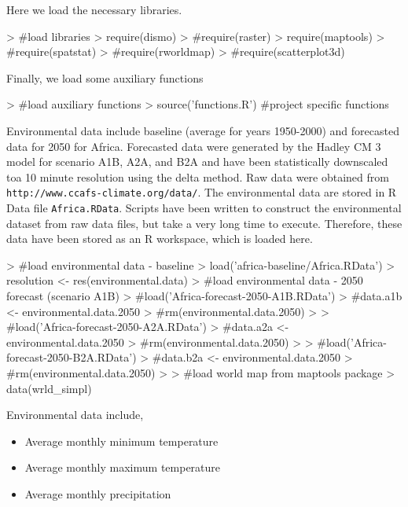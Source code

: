 \documentclass[10pt]{article}
\renewenvironment{Schunk}{\vspace{\topsep}}{\vspace{\topsep}}
\newcommand{\code}[1]{\texttt{#1}}
\begin{document}
Here we load the necessary libraries.
  
\begin{Schunk}
\begin{Sinput}
> #load libraries
> require(dismo)
> #require(raster)
> require(maptools)
> #require(spatstat)
> #require(rworldmap)
> #require(scatterplot3d)
\end{Sinput}
\end{Schunk}
  
Finally, we load some auxiliary functions
  
\begin{Schunk}
\begin{Sinput}
> #load auxiliary functions
> source('functions.R')   #project specific functions
\end{Sinput}
\end{Schunk}

Environmental data include baseline (average for years 1950-2000) and forecasted data for 2050 for Africa. Forecasted data were generated by the Hadley CM 3 model for scenario A1B, A2A, and B2A and have been statistically downscaled toa 10 minute resolution using the delta method. Raw data were obtained from \code{http://www.ccafs-climate.org/data/}. The environmental data are stored in R Data file \code{Africa.RData}. Scripts have been written to construct the environmental dataset from raw data files, but take a very long time to execute. Therefore, these data have been stored as an R workspace, which is loaded here.

\begin{Schunk}
\begin{Sinput}
> #load environmental data - baseline
> load('africa-baseline/Africa.RData')
> resolution <- res(environmental.data)
> #load environmental data - 2050 forecast (scenario A1B)
> #load('Africa-forecast-2050-A1B.RData')
> #data.a1b <- environmental.data.2050
> #rm(environmental.data.2050)
> 
> #load('Africa-forecast-2050-A2A.RData')
> #data.a2a <- environmental.data.2050
> #rm(environmental.data.2050)
> 
> #load('Africa-forecast-2050-B2A.RData')
> #data.b2a <- environmental.data.2050
> #rm(environmental.data.2050)
> 
> #load world map from maptools package
> data(wrld_simpl)
\end{Sinput}
\end{Schunk}

Environmental data include,

\begin{itemize}
\item Average monthly minimum temperature
\item Average monthly maximum temperature
\item Average monthly precipitation
\end{itemize}
\end{document}
